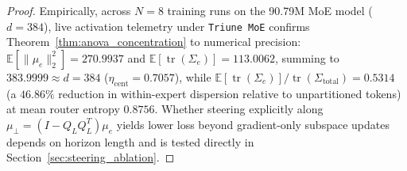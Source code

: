 \documentclass[10pt,twocolumn,letterpaper]{article}
\begin{document}
\begin{proof}
Empirically, across $N=8$ training runs on the 90.79M MoE model ($d=384$), live activation telemetry under \texttt{Triune MoE} confirms Theorem~\ref{thm:anova_concentration} to numerical precision: $\mathbb{E}[\|\mu_e\|_2^2] = 270.9937$ and $\mathbb{E}[\operatorname{tr}(\Sigma_e)] = 113.0062$, summing to $383.9999 \approx d=384$ ($\eta_{\text{cent}} = 0.7057$), while $\mathbb{E}[\operatorname{tr}(\Sigma_e)] / \operatorname{tr}(\Sigma_{\text{total}}) = 0.5314$ (a $46.86\%$ reduction in within-expert dispersion relative to unpartitioned tokens) at mean router entropy $0.8756$. Whether steering explicitly along $\mu_\perp = (I - Q_L Q_L^T)\mu_e$ yields lower loss beyond gradient-only subspace updates depends on horizon length and is tested directly in Section~\ref{sec:steering_ablation}.
\end{proof}
\end{document}
